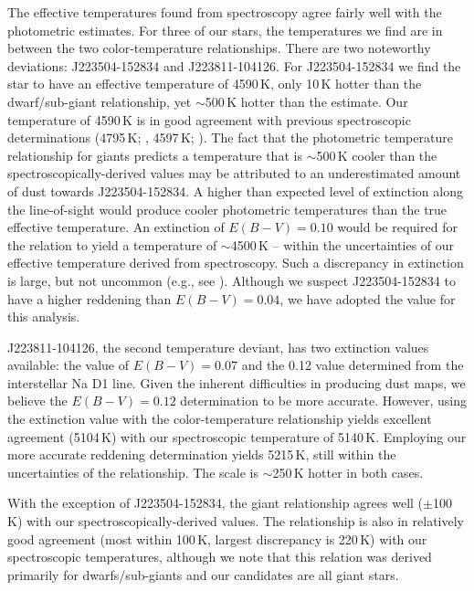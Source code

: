 \documentclass{emulateapj}
\begin{document}
The effective temperatures found from spectroscopy agree fairly well with the photometric estimates. For three of our stars, the temperatures we find are in between the two color-temperature relationships. There are two noteworthy deviations: J223504-152834 and J223811-104126. For J223504-152834 we find the star to have an effective temperature of 4590\,K, only 10\,K hotter than the \citet{casagrande;et-al_2010} dwarf/sub-giant relationship, yet ${\sim}$500\,K hotter than the \citet{alonso;et-al_1999} estimate. Our temperature of 4590\,K is in good agreement with previous spectroscopic determinations (4795\,K; \citet{williams;et-al_2011}, 4597\,K; \citet{wylie-de-boer;et-al_2012}). The fact that the \citet{alonso;et-al_1999} photometric temperature relationship for giants predicts a temperature that is ${\sim}$500\,K cooler than the spectroscopically-derived values may be attributed to an underestimated amount of dust towards J223504-152834. A higher than expected level of extinction along the line-of-sight would produce cooler photometric temperatures than the true effective temperature.  An extinction of $E(B-V) = 0.10$ would be required for the \citet{alonso;et-al_1999} relation to yield a temperature of ${\sim}$4500\,K \--- within the uncertainties of our effective temperature derived from spectroscopy. Such a discrepancy in extinction is large, but not uncommon (e.g., see \citet{nataf;et-al}). Although we suspect J223504-152834 to have a higher reddening than $E(B-V) = 0.04$, we have adopted the \citet{schlegel;et-al_1998} value for this analysis.

J223811-104126, the second temperature deviant, has two extinction values available: the \citet{schlegel;et-al_1998} value of $E(B-V) = 0.07$ and the 0.12 value determined from the interstellar Na D1 line. Given the inherent difficulties in producing dust maps, we believe the $E(B-V) = 0.12$ determination to be more accurate. However, using the \citet{schlegel;et-al_1998} extinction value with the \citet{alonso;et-al_1999} color-temperature relationship yields excellent agreement (5104\,K) with our spectroscopic temperature of 5140\,K. Employing our more accurate reddening determination yields 5215\,K, still within the uncertainties of the relationship. The \citet{casagrande;et-al_2010} scale is ${\sim}$250\,K hotter in both cases.

With the exception of J223504-152834, the \citet{alonso;et-al_1999} giant relationship agrees well ($\pm$100\,K) with our spectroscopically-derived values. The \citet{casagrande;et-al_2010} relationship is also in relatively good agreement (most within 100\,K, largest discrepancy is 220\,K) with our spectroscopic temperatures, although we note that this relation was derived primarily for dwarfs/sub-giants and our candidates are all giant stars.
\end{document}
